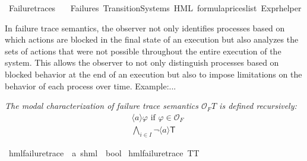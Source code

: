 %
\begin{isabellebody}%
%
%
\isadelimtheory
%
\endisadelimtheory
%
\isatagtheory
{}\isamarkupfalse%
\ Failure{\isacharunderscore}{\kern0pt}traces\isanewline
\ \ \ Failures\ Transition{\isacharunderscore}{\kern0pt}Systems\ HML\ formula{\isacharunderscore}{\kern0pt}prices{\isacharunderscore}{\kern0pt}list\ Expr{\isacharunderscore}{\kern0pt}helper\isanewline
{}%
\endisatagtheory
{\isafoldtheory}%
%
\isadelimtheory
%
\endisadelimtheory
%
\isadelimdocument
%
\endisadelimdocument
%
\isatagdocument
%
\isamarkuptrue%
%
\endisatagdocument
{\isafolddocument}%
%
\isadelimdocument
%
\endisadelimdocument
%
\begin{isamarkuptext}%
In failure trace semantics, the observer not only identifies processes based on which actions are blocked in the final state of an execution 
but also analyzes the sets of actions that were not possible throughout the entire execution of the system. 
This allows the observer to not only distinguish processes based on blocked behavior at the end of an execution but also to impose limitations on the behavior of each process over time.
Example:...%
\end{isamarkuptext}\isamarkuptrue%
%
\isadelimdocument
%
\endisadelimdocument
%
\isatagdocument
%
\isamarkuptrue%
%
\endisatagdocument
{\isafolddocument}%
%
\isadelimdocument
%
\endisadelimdocument
%
\begin{isamarkuptext}%
\textit{The \textnormal{modal characterization of failure trace semantics} $\mathcal{O}_FT$ is defined recursively:}
\begin{align*}
&\langle a \rangle \varphi \text{ if } \varphi \in \mathcal{O}_F\\
&\bigwedge_{i\in I} \lnot\langle a \rangle \textsf{T}
\end{align*}%
\end{isamarkuptext}\isamarkuptrue%
\isamarkupfalse%
\ hml{\isacharunderscore}{\kern0pt}failure{\isacharunderscore}{\kern0pt}trace\ {\isacharcolon}{\kern0pt}{\isacharcolon}{\kern0pt}\ {\isachardoublequoteopen}{\isacharparenleft}{\kern0pt}{\isacharprime}{\kern0pt}a{\isacharcomma}{\kern0pt}\ {\isacharprime}{\kern0pt}s{\isacharparenright}{\kern0pt}hml\ {\isasymRightarrow}\ bool{\isachardoublequoteclose}\ \isanewline
{\isachardoublequoteopen}hml{\isacharunderscore}{\kern0pt}failure{\isacharunderscore}{\kern0pt}trace\ TT{\isachardoublequoteclose}\ {\isacharbar}{\kern0pt}\isanewline

\end{isabellebody}
